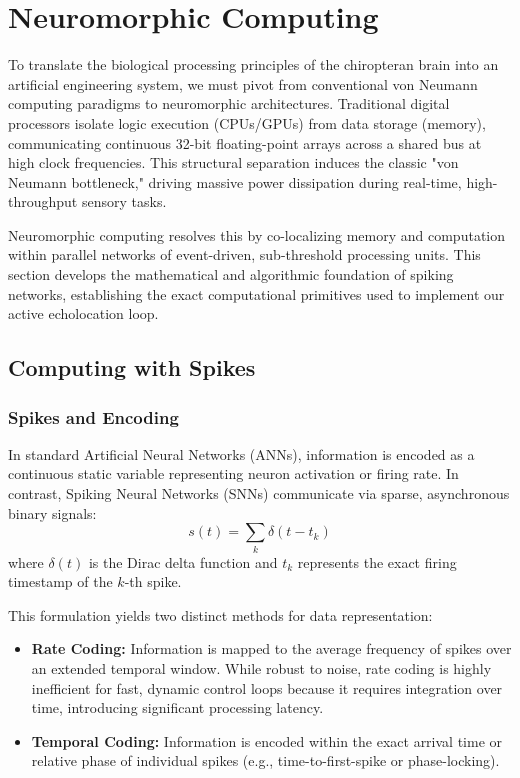 \section{Neuromorphic Computing}
To translate the biological processing principles of the chiropteran brain into an artificial engineering system, we must pivot from conventional von Neumann computing paradigms to neuromorphic architectures. Traditional digital processors isolate logic execution (CPUs/GPUs) from data storage (memory), communicating continuous 32-bit floating-point arrays across a shared bus at high clock frequencies. This structural separation induces the classic "von Neumann bottleneck," driving massive power dissipation during real-time, high-throughput sensory tasks. 

Neuromorphic computing resolves this by co-localizing memory and computation within parallel networks of event-driven, sub-threshold processing units. This section develops the mathematical and algorithmic foundation of spiking networks, establishing the exact computational primitives used to implement our active echolocation loop.

\subsection{Computing with Spikes}

\subsubsection{Spikes and Encoding}
In standard Artificial Neural Networks (ANNs), information is encoded as a continuous static variable representing neuron activation or firing rate. In contrast, Spiking Neural Networks (SNNs) communicate via sparse, asynchronous binary signals:
\begin{equation}
    s(t) = \sum_{k} \delta(t - t_k)
\end{equation}
where $\delta(t)$ is the Dirac delta function and $t_k$ represents the exact firing timestamp of the $k$-th spike. 

This formulation yields two distinct methods for data representation:
\begin{itemize}
    \item \textbf{Rate Coding:} Information is mapped to the average frequency of spikes over an extended temporal window. While robust to noise, rate coding is highly inefficient for fast, dynamic control loops because it requires integration over time, introducing significant processing latency.
    \item \textbf{Temporal Coding:} Information is encoded within the exact arrival time or relative phase of individual spikes (e.g., time-to-first-spike or phase-locking). 
\end{itemize}

